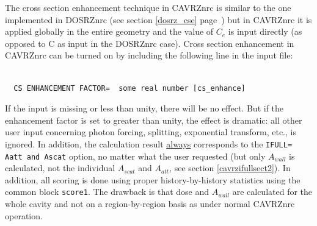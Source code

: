 \documentclass[12pt,twoside]{article}  %
\begin{document}
The cross section enhancement technique in CAVRZnrc is
similar to the one implemented in DOSRZnrc
(see section \ref{dosrz_cse} page~\pageref{dosrz_cse}) but
in CAVRZnrc it is applied globally in the entire geometry and the value of
$C_e$ is input directly (as opposed to C as input in the DOSRZnrc case).
Cross section enhancement in CAVRZnrc can be turned on by
including the following line in the input file:
\begin{verbatim}

  CS ENHANCEMENT FACTOR=  some real number [cs_enhance]

\end{verbatim}
If the input is missing or less than unity, there will be
no effect.  But if the enhancement factor is set to greater than unity, the
effect is dramatic: all other user input concerning photon forcing,
splitting, exponential transform, etc., is ignored. In addition,
the calculation result \underline{always} corresponds
to the {\tt IFULL= Aatt and Ascat} option, no matter what the
user requested (but only $A_{wall}$ is calculated,
not the individual $A_{scat}$ and $A_{att}$, see
section \ref{cavrzifullsect2}). In addition, all scoring
is done using proper history-by-history statistics using
the common block {\tt score1}.  The drawback is that dose
and $A_{wall}$ are calculated for the whole cavity and
not on a region-by-region basis as under normal
CAVRZnrc operation.
\end{document}
